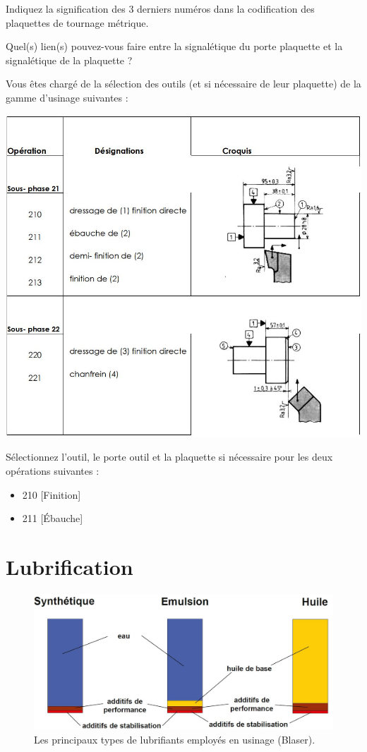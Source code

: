 \documentclass[12pt]{article}
\newcounter{exo}
\newenvironment{exo}{\stepcounter{exo}\vspace{0.5cm}{\bfseries Question \theexo\ :}}{\par\vspace{0.5cm}}
\begin{document}
\begin{exo} Indiquez la signification des 3 derniers numéros dans la codification des plaquettes de tournage métrique. \end{exo}


\begin{exo} Quel(s) lien(s) pouvez-vous faire entre la signalétique du porte plaquette et la signalétique de la plaquette ?\end{exo}

\begin{tcolorbox}[colback=blue!5!white,colframe=red!75!black]
   \bcdodecaedre Vous êtes chargé de la sélection des outils (et si nécessaire de leur plaquette) de la gamme d'usinage suivantes :
\begin{center}
\includegraphics[width=0.75\linewidth]{Images/G1.JPG}
\end{center}   
  \end{tcolorbox}



\begin{exo} Sélectionnez l'outil, le porte outil et la plaquette si nécessaire pour les deux opérations suivantes :
\begin{itemize}
    \item 210 [Finition]
    \item 211 [Ébauche]
\end{itemize}
\end{exo}



\section{Lubrification}
\begin{figure}[h]
\centering
\includegraphics[width=0.7\linewidth]{Images/LU1.JPG}
\caption{Les principaux types de lubrifiants employés en usinage (Blaser).}
\label{bridppe}
\end{figure}
\end{document}

